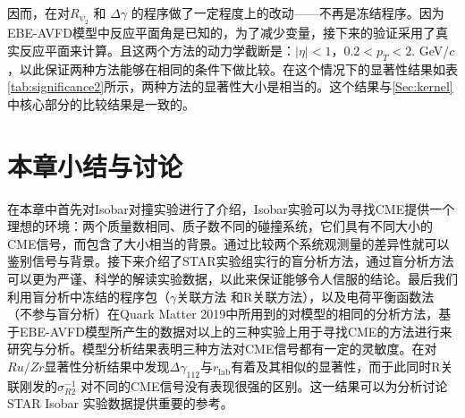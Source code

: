 因而，在对$R_{\psi_2}$ 和 $\Delta \gamma$ 的程序做了一定程度上的改动——不再是冻结程序。因为EBE-AVFD模型中反应平面角是已知的，为了减少变量，接下来的验证采用了真实反应平面来计算。且这两个方法的动力学截断是：$|\eta|<1$，$0.2 < p_T < 2. $ GeV/$c$ ，以此保证两种方法能够在相同的条件下做比较。在这个情况下的显著性结果如表\ref{tab:significance2}所示，两种方法的显著性大小是相当的。这个结果与\ref{Sec:kernel}中核心部分的比较结果是一致的。


\begin{center}
\begin{table}[tbh]
\centering
\caption{$\gamma$关联方法和R关联方法在真实反应平面、相同动力学阶段下 $Ru/Zr$的显著性结果}
\resizebox{0.48\textwidth}{!}{ %
    \begin{tabular}{c|cccccc}
    \toprule
    $n_{5}/s$ & $N_\mathrm{event}$ & $\Delta \gamma_{112} $ & $\kappa_{112}$ & $ \sigma_{R2}^{-1}$ \\
    \hline\noalign{\smallskip}
    0    &   $2\times 10^8 $      &  0.67 & 0.97 & 0.56 \\
    0.05 &    $4\times 10^8 $   &   2.84 &3.78 & 3.33\\
    0.10 &    $4\times 10^8 $   &   11.78 & 14.13 & 10.85 \\
    0.20 &     $2\times 10^8 $  &   37.48 & 47.64 & 27.94\\
    \bottomrule
    \end{tabular}
    }
    \label{tab:significance2}
\end{table}
\end{center}




\section{本章小结与讨论}

在本章中首先对Isobar对撞实验进行了介绍，Isobar实验可以为寻找CME提供一个理想的环境：两个质量数相同、质子数不同的碰撞系统，它们具有不同大小的CME信号，而包含了大小相当的背景。通过比较两个系统观测量的差异性就可以鉴别信号与背景。接下来介绍了STAR实验组实行的盲分析方法，通过盲分析方法可以更为严谨、科学的解读实验数据，以此来保证能够令人信服的结论。最后我们利用盲分析中冻结的程序包（$ \gamma$关联方法 和R关联方法），以及电荷平衡函数法（不参与盲分析）在Quark Matter 2019中所用到的对模型的相同的分析方法，基于EBE-AVFD模型所产生的数据对以上的三种实验上用于寻找CME的方法进行来研究与分析。模型分析结果表明三种方法对CME信号都有一定的灵敏度。在对$Ru/Zr$显著性分析结果中发现$\Delta \gamma_{112}$与$r_{\mathrm{lab}}$有着及其相似的显著性，而于此同时R关联刚发的$ \sigma_{R2}^{-1}$ 对不同的CME信号没有表现很强的区别。这一结果可以为分析讨论STAR Isobar 实验数据提供重要的参考。